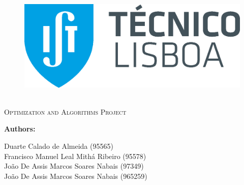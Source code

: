 \documentclass[12pt]{article}
\newcommand{\HRule}{\rule{\linewidth}{0.5mm}} %
\begin{document}
\begin{center}
    \begin{figure}
        \vspace{-1.0cm}
        \includegraphics[scale = 0.3, left]{Images/IST_A.eps} %
    \end{figure}
    \mbox{}\\[2.0cm]
    \textsc{\Huge Optimization and Algorithms Project}\\[2.5cm]
\end{center}

\begin{flushleft}
    \textbf{Authors:}
\end{flushleft}

\begin{center}
    \begin{minipage}{0.5\textwidth}
        \begin{flushleft}
            Duarte Calado de Almeida (95565)\\
            Francisco Manuel Leal Mithá Ribeiro (95578)\\
            João De Assis Marcos Soares Nabais (97349)\\ 
            João De Assis Marcos Soares Nabais (965259)
        \end{flushleft}
    \end{minipage}%
\end{center}
    
\end{document}
